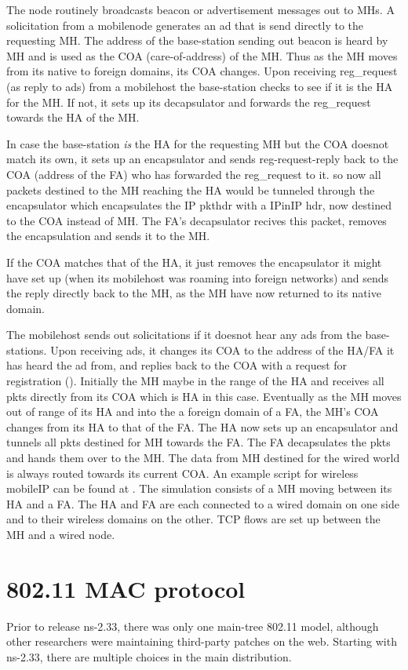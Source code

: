 The  node routinely broadcasts beacon or
advertisement messages out to MHs. A solicitation from a mobilenode
generates an ad that is send directly to the requesting MH. The
address of the base-station sending out beacon is heard by 
MH and is used as the COA (care-of-address) of the MH. Thus as the MH
moves from its native to foreign domains, its COA changes. 
Upon receiving  reg\_request (as reply to ads) from a mobilehost the
base-station checks to see if it is the HA for the MH. If not, it sets
up its decapsulator and forwards the reg\_request towards the HA of
the MH. 

In case the base-station {\em is} the HA for the requesting MH but the
COA doesnot match its own, it sets up an encapsulator and sends
reg-request-reply back to the COA (address of the FA) who has
forwarded the reg\_request to it. so now all packets destined to the
MH reaching the HA would be tunneled through the encapsulator which
encapsulates the IP pkthdr with a IPinIP hdr, now destined to the COA
instead of MH. The FA's decapsulator recives this packet, removes the
encapsulation and sends it to the MH.

If the COA matches that of the HA, it just removes the encapsulator it
might have set up (when its mobilehost was roaming into foreign
networks) and sends the reply directly back to the MH, as the MH have
now returned to its native domain.

The mobilehost sends out solicitations if it doesnot hear any ads from the
base-stations. Upon receiving ads, it changes its COA to the address of
the HA/FA it has heard the ad from, and replies back to the COA with a
request for registration ().
Initially the MH maybe in the range of the HA and receives all pkts
directly from its COA which is HA in this case. 
Eventually as the MH moves out of range of its HA and into the a foreign
domain of a FA, the MH's COA changes from its HA to that of the FA. The HA
now sets up an encapsulator and tunnels all pkts destined for MH towards
the FA. The FA decapsulates the pkts and hands them over to the MH. The
data from MH destined for the wired world is always routed towards its
current COA.  
An example script for wireless mobileIP can be found at
. The simulation consists of a MH moving
between its HA and a FA. The HA and FA are each connected to a wired
domain on one side and to their wireless domains on the other. TCP flows
are set up between the MH and a wired node. 

\section{802.11 MAC protocol}
\label{sec:802_11}
Prior to release ns-2.33, there was only one main-tree 802.11 model,
although other researchers were maintaining third-party patches
on the web.  Starting with ns-2.33, there are multiple choices in
the main distribution.

